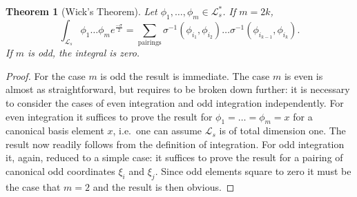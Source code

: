 \documentclass[]{amsart}
\newtheorem{theorem}{Theorem}[section]
\theoremstyle{definition}
\begin{document}
\begin{theorem}[Wick's Theorem]\label{thm_wick}
Let $\phi_1,\dots ,\phi_{m} \in \mathcal{L}_s^*$. If $m=2k$,
\[
\int_{\mathcal{L}_s} \phi_1\dots \phi_m e^{\frac{-\sigma}{2} }  = \sum_{\mathrm{pairings}}\sigma^{-1} (\phi_{i_1},\phi_{i_2})\dots \sigma^{-1} (\phi_{i_{k-1}},\phi_{i_k}).
\]
If $m$ is odd, the integral is zero.
\end{theorem}
\begin{proof}
For the case $m$ is odd the result is immediate. The case $m$ is even is almost as straightforward, but requires to be broken down further: it is necessary to consider the cases of even integration and odd integration independently. For even integration it suffices to prove the result for $\phi_1=\dots=\phi_m=x$ for a canonical basis element $x$, i.e.\ one can assume $\mathcal{L}_s$ is of total dimension one. The result now readily follows from the definition of integration. For odd integration it, again, reduced to a simple case: it suffices to prove the result for a pairing of canonical odd coordinates $\xi_i$ and $\xi_j$. Since odd elements square to zero it must be the case that $m=2$ and the result is then obvious.
\end{proof}
\end{document}
